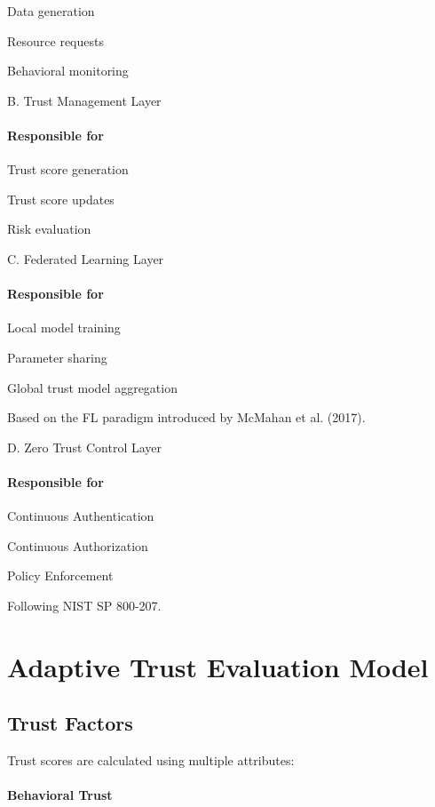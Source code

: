 Data generation


Resource requests


Behavioral monitoring


B. Trust Management Layer


\paragraph{Responsible for}

Trust score generation


Trust score updates


Risk evaluation


C. Federated Learning Layer


\paragraph{Responsible for}

Local model training


Parameter sharing


Global trust model aggregation


Based on the FL paradigm introduced by McMahan et al. (2017).


D. Zero Trust Control Layer


\paragraph{Responsible for}

Continuous Authentication


Continuous Authorization


Policy Enforcement


Following NIST SP 800-207.


\section{Adaptive Trust Evaluation Model}

\subsection{Trust Factors}

Trust scores are calculated using multiple attributes:


\paragraph{Behavioral Trust}

